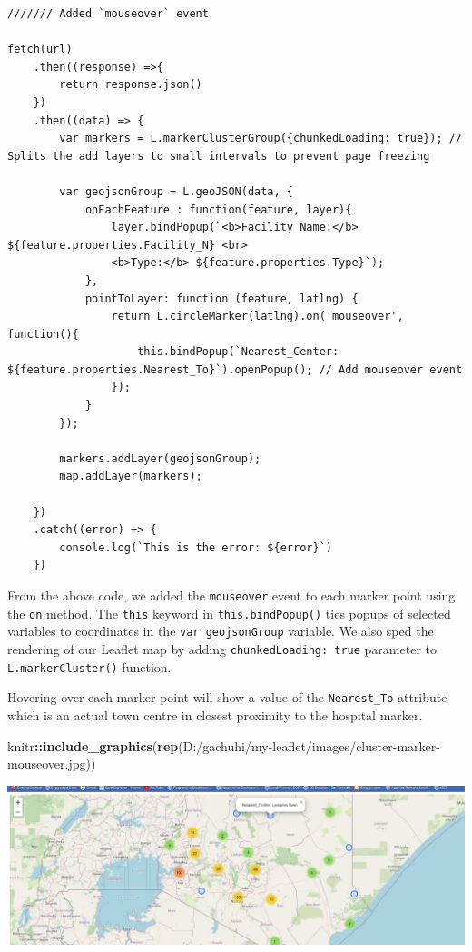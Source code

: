 \documentclass[
]{book}
\newenvironment{Shaded}{\begin{snugshade}}{\end{snugshade}}
\newcommand{\FunctionTok}[1]{\textcolor[rgb]{0.13,0.29,0.53}{\textbf{#1}}}
\newcommand{\NormalTok}[1]{#1}
\newcommand{\SpecialCharTok}[1]{\textcolor[rgb]{0.81,0.36,0.00}{\textbf{#1}}}
\newcommand{\StringTok}[1]{\textcolor[rgb]{0.31,0.60,0.02}{#1}}
\begin{document}
\begin{verbatim}
/////// Added `mouseover` event

fetch(url)
    .then((response) =>{
        return response.json()
    })
    .then((data) => {
        var markers = L.markerClusterGroup({chunkedLoading: true}); // Splits the add layers to small intervals to prevent page freezing

        var geojsonGroup = L.geoJSON(data, {
            onEachFeature : function(feature, layer){
                layer.bindPopup(`<b>Facility Name:</b> ${feature.properties.Facility_N} <br>
                <b>Type:</b> ${feature.properties.Type}`);
            },
            pointToLayer: function (feature, latlng) {
                return L.circleMarker(latlng).on('mouseover', function(){
                    this.bindPopup(`Nearest_Center: ${feature.properties.Nearest_To}`).openPopup(); // Add mouseover event
                });
            }
        });

        markers.addLayer(geojsonGroup);
        map.addLayer(markers);

    })
    .catch((error) => {
        console.log(`This is the error: ${error}`)
    })
\end{verbatim}

From the above code, we added the \texttt{mouseover} event to each marker point using the \texttt{on} method. The \texttt{this} keyword in \texttt{this.bindPopup()} ties popups of selected variables to coordinates in the \texttt{var\ geojsonGroup} variable. We also sped the rendering of our Leaflet map by adding \texttt{chunkedLoading:\ true} parameter to \texttt{L.markerCluster()} function.

Hovering over each marker point will show a value of the \texttt{Nearest\_To} attribute which is an actual town centre in closest proximity to the hospital marker.

\begin{Shaded}
\begin{Highlighting}[]
\NormalTok{knitr}\SpecialCharTok{::}\FunctionTok{include\_graphics}\NormalTok{(}\FunctionTok{rep}\NormalTok{(}\StringTok{\textquotesingle{}D:/gachuhi/my{-}leaflet/images/cluster{-}marker{-}mouseover.jpg\textquotesingle{}}\NormalTok{))}
\end{Highlighting}
\end{Shaded}

\includegraphics{../images/cluster-marker-mouseover.jpg}
\end{document}
